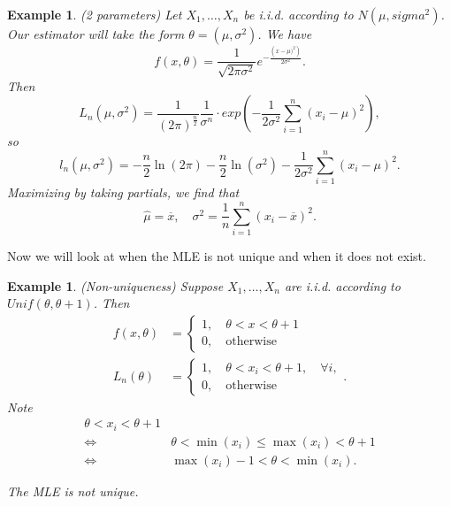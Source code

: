 \documentclass{tufte-handout}
\newtheorem{ex}[thm]{Example}
\theoremstyle{definition}
\begin{document}
\begin{ex}
	(2 parameters) Let $X_1,\ldots,X_n$ be i.i.d. according to $N(\mu,sigma^2)$. Our estimator will take the form $\theta = \left( \mu, \sigma^2 \right)$. 
	We have \[
		f(x,\theta) = \frac{1}{\sqrt{2\pi \sigma^2} } e^{-\frac{\left( x-\mu)^2 \right)}{2\sigma^2}}
	.\] Then \[
		L_n(\mu,\sigma^2) = \frac{1}{\left( 2\pi \right)^{\frac{n}{2}}} \frac{1}{\sigma^n} \cdot exp\left( -\frac{1}{2\sigma^2} \sum\limits_{i=1}^{n} \left( x_i - \mu \right)^2 \right)
	,\] so \[
		l_n(\mu,\sigma^2) = -\frac{n}{2} \ln{(2\pi)} - \frac{n}{2}\ln{(\sigma^2)} - \frac{1}{2\sigma^2} \sum\limits_{i=1}^{n} \left( x_i - \mu \right)^2
	.\] Maximizing by taking partials, we find that \[
		\hat{\mu} = \overline{x},\quad \sigma^2 = \frac{1}{n}\sum\limits_{i=1}^{n} \left( x_i - \overline{x} \right)^2
	.\] 
\end{ex}

Now we will look at when the MLE is not unique and when it does not exist.

\begin{ex}
	(Non-uniqueness) Suppose $X_1,\ldots,X_n$ are i.i.d. according to $Unif(\theta, \theta+1)$. Then
	\begin{align*}
		f(x,\theta) &= \begin{cases}
			1, \quad \theta < x< \theta + 1 \\
			0, \quad \text{otherwise}
		\end{cases} \\
			L_n(\theta) &= \begin{cases}
				1, \quad \theta < x_i < \theta + 1, \quad \forall i,\\
				0, \quad \text{otherwise}
			\end{cases}
	.\end{align*}
	Note 
	\begin{align*}
		\theta < x_i < \theta + 1 \\
		\iff &\theta < \min(x_i) \le \max(x_i) < \theta + 1 \\
		\iff &\max(x_i) - 1 < \theta < \min(x_i)
	.\end{align*}

	The MLE is not unique.
\end{ex}
\end{document}
